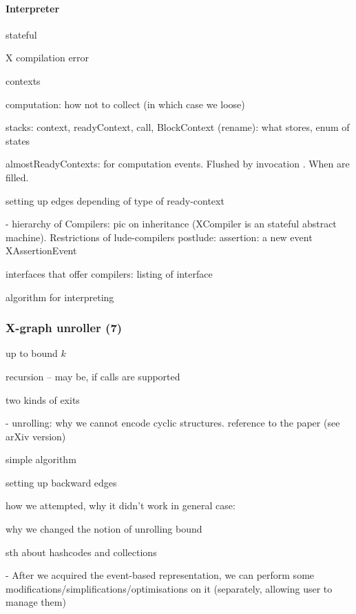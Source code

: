 \paragraph{Interpreter}
\label{ch:impl:proc:x-compiler:compilation}

stateful

X compilation error

contexts

computation: how not to collect (in which case we loose)

stacks: context, readyContext, call, 
  BlockContext (rename): what stores, enum of states
  
almostReadyContexts: for computation events. Flushed by invocation . When are filled.

setting up edges depending of type of ready-context

- hierarchy of Compilers: pic on inheritance (XCompiler is an stateful abstract machine). Restrictions of lude-compilers
  postlude: assertion: a new event XAssertionEvent

interfaces that offer compilers: listing of interface

algorithm for interpreting



\subsubsection{X-graph unroller (7)}
\label{ch:impl:proc:x-unroll}

up to bound $k$ 

recursion -- may be, if calls are supported

two kinds of exits

- unrolling: why we cannot encode cyclic structures. reference to the paper (see arXiv version)

simple algorithm

setting up backward edges

how we attempted, why it didn't work in general case:

why we changed the notion of unrolling bound

sth about hashcodes and collections

- After we acquired the event-based representation, we can perform some modifications/simplifications/optimisations on it (separately, allowing user to manage them)


